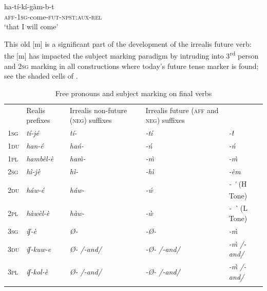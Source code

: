 \documentclass[output=paper]{langsci/langscibook}
\begin{document}
\ea\label{ex:mahland:77}
\gll ha-t\'{i}-k\'{i}-g\`{a}m-b-t\\
  \textsc{aff-1sg}{}-come-\textsc{fut-npst:aux-rel}\\\glt `that I will come'
\z

This old [m] is a significant part of the development of the irrealis future verb: the [m] has impacted the subject marking paradigm by intruding into 3\textsuperscript{rd} person and \textsc{2sg} marking in all constructions where today's future tense marker is found; see the shaded cells of . 

\begin{table}
\caption{Free pronouns and subject marking on final verbs \citep[7]{Ahland2014b}}
\label{tab:7}
\begin{tabularx}{\textwidth}{XXXXX}
\lsptoprule

\multicolumn{2}{X}{\mdseries Free pronouns} & \mdseries Realis prefixes & \mdseries Irrealis non-future (\textsc{neg}) suffixes & \mdseries Irrealis future (\textsc{aff} and \textsc{neg}) suffixes\\
\mdseries \textsc{1sg} & \itshape t\'{i}-j\'{e} & \itshape t\'{i}- & \itshape {}-t\'{i} & \itshape {}-\'{t}\\
\mdseries \textsc{1du} & \itshape han-\'{e} & \itshape ha\'{n}- & \itshape {}-\'{n} & \itshape {}-\'{n}\\
\mdseries \textsc{1pl} & \itshape hamb\`{e}l-\`{e} & \itshape ha\`{m}- & \itshape {}-\`{m} & \itshape {}-\`{m}\\
\mdseries \textsc{2sg} & \itshape h\`{i}-j\`{e} & \itshape h\`{i}- & \itshape {}-h\`{i} & \itshape {}-\`{e}m \\
\mdseries \textsc{2du} & \itshape h\'{a}w-\'{e} & \itshape h\'{a}w- & \itshape {}-\'{w} & \mdseries \textit{{}- }\textit{\textsubscript{ }}\textit{ \'{ }  }(H Tone)\\
\mdseries \textsc{2pl} & \itshape h\`{a}w\`{e}l-\`{e} & \itshape h\`{a}w- & \itshape {}-\`{w} & \mdseries \textit{{}-   \`{ }  }(L Tone)\\
\mdseries \textsc{3sg} & \itshape \'{i}ʃ-\`{e} & \itshape Ø- & \itshape {}-Ø- & \itshape {}-\`{m}\\
\mdseries \textsc{3du} & \itshape \'{i}ʃ-kuw-e & \itshape Ø-   /-and/ & \itshape {}-Ø-   /-and/ & \itshape {}-\`{m}     /-and/\\
\mdseries \textsc{3pl} & \itshape \'{i}ʃ-kol-\`{e} & \itshape Ø-   /-and/ & \itshape {}-Ø-   /-and/ & \itshape {}-\`{m}    /-and/\\
\lspbottomrule
\end{tabularx}
\end{table}
\end{document}
